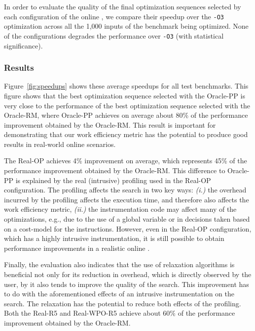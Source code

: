 

In order to evaluate the quality of the final optimization sequences selected by each configuration of the online {\itercomp}, we compare
their speedup over the \texttt{-O3} optimization across all the 1,000 inputs of the benchmark being optimized. None of the configurations
degrades the performance over \texttt{-O3} (with statistical significance).

\subsubsection{Results}

Figure~\ref{fig:speedups} shows these average speedups for all test benchmarks.
This figure shows that the best optimization sequence selected with the Oracle-PP
is very close to the performance of the best optimization sequence selected with
the Oracle-RM, where Oracle-PP achieves on average about 80\% of the performance
improvement obtained by the Oracle-RM.
This result is important for demonstrating that our work efficiency metric has
the potential to produce good results in real-world online scenarios.

The Real-OP achieves 4\% improvement on average, which represents 45\% of the
performance improvement obtained by the Oracle-RM.
This difference to Oracle-PP is explained by the real (intrusive) profiling used
in the Real-OP configuration.
The profiling affects the search in two key ways:
\textit{(i.)} the overhead incurred by the profiling affects the execution time,
and therefore also affects the work efficiency metric,
\textit{(ii.)} the instrumentation code may affect many of the optimizations, e.g.,
due to the use of a global variable or in decisions taken based on a cost-model
for the instructions.
However, even in the Real-OP configuration, which has a highly intrusive instrumentation,
it is still possible to obtain performance improvements in a realistic online
{\itercomp}.

Finally, the evaluation also indicates that the use of relaxation algorithms
is beneficial not only for its reduction in overhead, which is directly observed
by the user, by it also tends to improve the quality of the search.
This improvement has to do with the aforementioned effects of an intrusive
instrumentation on the search.
The relaxation has the potential to reduce both effects of the profiling.
Both the Real-R5 and Real-WPO-R5 achieve about 60\% of the
performance improvement obtained by the Oracle-RM.
